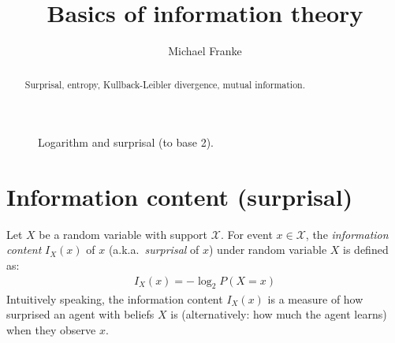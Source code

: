 \documentclass[nobib,nofonts]{tufte-handout}
\title{Basics of information theory}
\author[M.~Franke]{Michael Franke}
\date{} %
\begin{document}
\maketitle

\begin{abstract}
\noindent
Surprisal, entropy, Kullback-Leibler divergence, mutual information.
\end{abstract}

\begin{figure}
  \centering
\hfill
{}

\caption{Logarithm and surprisal (to base 2).}
\label{fig:log-surprisal}
\end{figure}

\section{Information content (surprisal)}

Let $X$ be a random variable with support $\mathcal{X}$. For event $x \in \mathcal{X}$, the \emph{information content} $I_{X}(x)$ of $x$ (a.k.a.~\emph{surprisal} of $x$) under random variable $X$ is defined as:
\begin{align*}
  I_{X}(x) = - \log_{2} P(X = x)
\end{align*}
Intuitively speaking, the information content $I_{X}(x)$ is a measure of how surprised an agent with beliefs $X$ is (alternatively: how much the agent learns) when they observe $x$.
\end{document}
